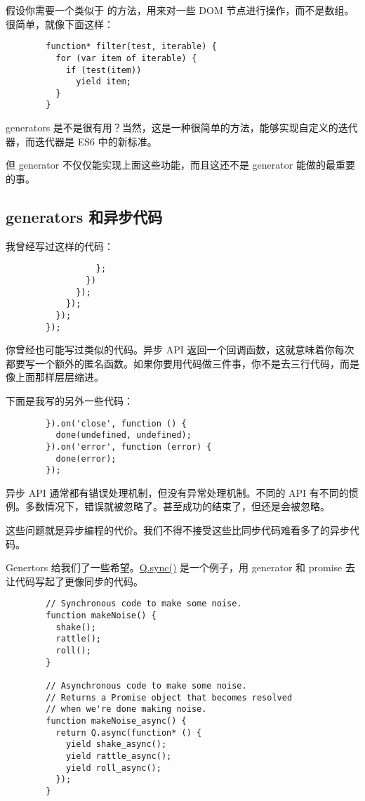       假设你需要一个类似于  的方法，用来对一些 DOM 节点进行操作，而不是数组。很简单，就像下面这样：

      \begin{lstlisting}
        function* filter(test, iterable) {
          for (var item of iterable) {
            if (test(item))
              yield item;
          }
        }
      \end{lstlisting}

      generators 是不是很有用？当然，这是一种很简单的方法，能够实现自定义的迭代器，而迭代器是 ES6 中的新标准。

      但 generator 不仅仅能实现上面这些功能，而且这还不是 generator 能做的最重要的事。

  \subsection{generators 和异步代码}
    \label{subsec:generators_和异步代码}
      我曾经写过这样的代码：

      \begin{lstlisting}
                  };
                })
              });
            });
          });
        });
      \end{lstlisting}

      你曾经也可能写过类似的代码。异步 API 返回一个回调函数，这就意味着你每次都要写一个额外的匿名函数。如果你要用代码做三件事，你不是去三行代码，而是像上面那样层层缩进。

      下面是我写的另外一些代码：

      \begin{lstlisting}
        }).on('close', function () {
          done(undefined, undefined);
        }).on('error', function (error) {
          done(error);
        });
      \end{lstlisting}

      异步 API 通常都有错误处理机制，但没有异常处理机制。不同的 API 有不同的惯例。多数情况下，错误就被忽略了。甚至成功的结束了，但还是会被忽略。

      这些问题就是异步编程的代价。我们不得不接受这些比同步代码难看多了的异步代码。

      Genertors 给我们了一些希望。\href{https://github.com/kriskowal/q/tree/v1/examples/async-generators}{Q.sync()} 是一个例子，用 generator 和 promise 去让代码写起了更像同步的代码。

      \begin{lstlisting}
        // Synchronous code to make some noise.
        function makeNoise() {
          shake();
          rattle();
          roll();
        }

        // Asynchronous code to make some noise.
        // Returns a Promise object that becomes resolved
        // when we're done making noise.
        function makeNoise_async() {
          return Q.async(function* () {
            yield shake_async();
            yield rattle_async();
            yield roll_async();
          });
        }
      \end{lstlisting}


